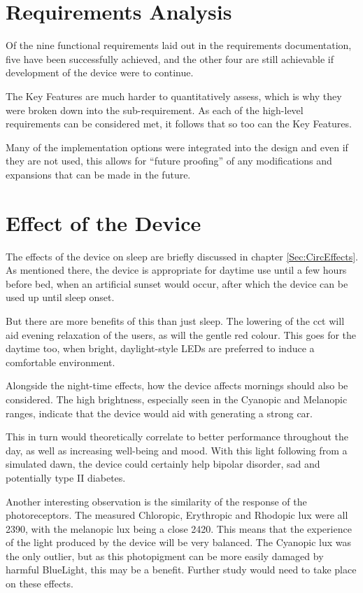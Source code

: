 \section{Requirements Analysis}

Of the nine functional requirements laid out in the requirements documentation, five have been successfully achieved, and the other four are still achievable if development of the device were to continue.

The Key Features are much harder to quantitatively assess, which is why they were broken down into the sub-requirement. As each of the high-level requirements can be considered met, it follows that so too can the Key Features.

Many of the implementation options were integrated into the design and even if they are not used, this allows for ``future proofing'' of any modifications and expansions that can be made in the future.

\section{Effect of the Device}

The effects of the device on sleep are briefly discussed in chapter \ref{Sec:CircEffects}. As mentioned there, the device is appropriate for daytime use until a few hours before bed, when an artificial sunset would occur, after which the device can be used up until sleep onset.

But there are more benefits of this than just sleep. The lowering of the \acrshort{cct} will aid evening relaxation of the users, as will the gentle red colour. This goes for the daytime too, when bright, daylight-style LEDs are preferred to induce a comfortable environment.

Alongside the night-time effects, how the device affects mornings should also be considered. The high brightness, especially seen in the Cyanopic and Melanopic ranges, indicate that the device would aid with generating a strong \acrfull{car}. 

This in turn would theoretically correlate to better performance throughout the day, as well as increasing well-being and mood. With this light following from a simulated dawn, the device could certainly help bipolar disorder, \acrshort{sad} and potentially type II diabetes.

Another interesting observation is the similarity of the response of the photoreceptors. The measured Chloropic, Erythropic and Rhodopic lux were all 2390, with the melanopic lux being a close 2420. This means that the experience of the light produced by the device will be very balanced. The Cyanopic lux was the only outlier, but as this photopigment can be more easily damaged by harmful \gls{BlueLight}, this may be a benefit. Further study would need to take place on these effects.


